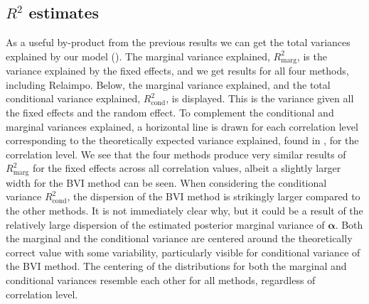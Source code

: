 \subsection{\texorpdfstring{$R^2$}{Lg} estimates}
\label{sec:R2} 
As a useful by-product from the previous results we can get the total variances explained by our model ().
The marginal variance explained, $R^2_{\text{marg}}$, is the variance explained by the fixed effects, and we get results for all four methods, including Relaimpo.
Below, the marginal variance explained, and the total conditional variance explained, $R^2_{\text{cond}}$, is displayed. 
This is the variance given all the fixed effects and the random effect.
To complement the conditional and marginal variances explained, a horizontal line is drawn for each correlation level corresponding to the theoretically expected variance explained, found in , for the correlation level. 
\newline
\newline
We see that the four methods produce very similar results of $R^2_{\text{marg}}$ for the fixed effects across all correlation values, albeit a slightly larger width for the BVI method can be seen.
When considering the conditional variance $R^2_{\text{cond}}$, the dispersion of the BVI method is strikingly larger compared to the other methods. 
It is not immediately clear why, but it could be a result of the relatively large dispersion of the estimated posterior marginal variance of $\boldsymbol{\alpha}$.
Both the marginal and the conditional variance are centered around the theoretically correct value with some variability, particularly visible for conditional variance of the BVI method. 
The centering of the distributions for both the marginal and conditional variances resemble each other for all methods, regardless of correlation level.
